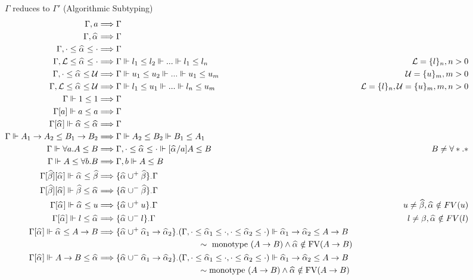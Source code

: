 \documentclass{article}
\theoremstyle{definition}
\newcommand{\all}[1]{\forall #1.}
\begin{document}
\begin{figure}[htp]
{\small 
\phantom{phantom} \hfill {} \hfill $\Gamma$ reduces to $\Gamma'$ (Algorithmic Subtyping)
		$$\begin{aligned}
			\Gamma, a &\Longrightarrow \Gamma \\
			\Gamma, \al &\Longrightarrow \Gamma \\
			\Gamma, \cdot \le \al \le \cdot &\Longrightarrow \Gamma \\
			\Gamma, \mathcal{L}\le \al \le \cdot &\Longrightarrow \Gamma \Vdash l_1 \le l_2 \Vdash ... \Vdash l_1 \le l_n \qquad &\mathcal{L}=\{l\}_n, n>0\\
			\Gamma, \cdot\le \al \le\mathcal{U} &\Longrightarrow \Gamma \Vdash u_1 \le u_2 \Vdash ... \Vdash u_1 \le u_m  \qquad &\mathcal{U}=\{u\}_m, m>0\\
			\Gamma, \mathcal{L}\le \al \le\mathcal{U} &\Longrightarrow \Gamma \Vdash l_1 \le u_1 \Vdash ... \Vdash l_n \le u_m  & \mathcal{L}=\{l\}_n, \mathcal{U}=\{u\}_m, m, n > 0\\
			\Gamma \Vdash 1\le 1 &\Longrightarrow \Gamma\\
			\Gamma[a] \Vdash a\le a &\Longrightarrow \Gamma\\
			\Gamma[\al] \Vdash \al\le \al &\Longrightarrow \Gamma\\
			\Gamma \Vdash A_1\to A_2 \le B_1\to B_2 &\Longrightarrow \Gamma \Vdash A_2 \le B_2 \Vdash B_1\le A_1\\
			\Gamma \Vdash \all a A\le B &\Longrightarrow \Gamma,\cdot\le\al\le\cdot \Vdash [\al/a]A\le B & B \neq \all * *\\
			\Gamma \Vdash A\le \all b B &\Longrightarrow \Gamma,b \Vdash A\le B\\
			\Gamma[\bt][\al] \Vdash \al \le \bt  &\Longrightarrow
			\{\al\cup^+\bt\}_{\cdot}\Gamma \\
			\Gamma[\bt][\al] \Vdash \bt \le \al  &\Longrightarrow \{\al\cup^-\bt\}_{\cdot}\Gamma \\
			\Gamma[\al] \Vdash \al\le u &\Longrightarrow \{\al\cup^+u\}_{\cdot}\Gamma &u\neq\bt, \al \notin FV(u) \\
			\Gamma[\al] \Vdash  l \le \al &\Longrightarrow \{\al\cup^-l\}_{\cdot}\Gamma &l\neq\beta, \al \notin FV(l)\\
            \Gamma[\al] \Vdash \al \le A\to B &\Longrightarrow \{\al\cup^+\al[1] \to \al[2] \}_{\cdot}(\Gamma, \cdot\le \al[1]\le\cdot, \cdot\le \al[2]\le\cdot)\Vdash \al[1] \to \al[2] \le A \to B\\
            &\qquad\qquad\qquad\qquad\qquad\qquad\sim\text{ monotype } (A\to B) \wedge \al \notin \text{FV}(A \to B)\\
            \Gamma[\al] \Vdash  A\to B\le\al &\Longrightarrow \{\al\cup^-\al[1] \to\al[2]\}_{\cdot}(\Gamma, \cdot\le\al[1]\le\cdot, \cdot\le\al[2]\le\cdot) \Vdash \al[1] \to \al[2] \le A \to B\\
            &\qquad\qquad\qquad\qquad\qquad\qquad\sim\text{monotype } (A\to B) \wedge \al \notin \text{FV}(A \to B)\\
		\end{aligned}
		$$
}
\end{figure}
\end{document}
